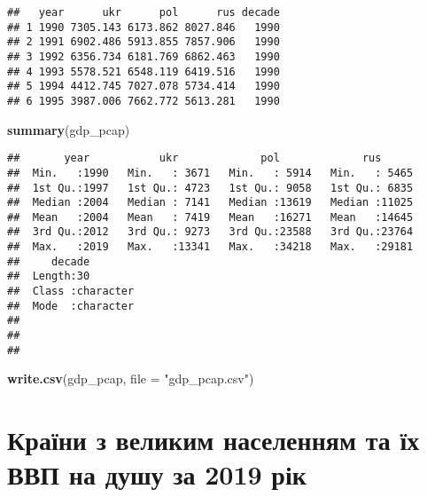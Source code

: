 \documentclass[
]{article}
\newenvironment{Shaded}{\begin{snugshade}}{\end{snugshade}}
\newcommand{\DataTypeTok}[1]{\textcolor[rgb]{0.13,0.29,0.53}{#1}}
\newcommand{\KeywordTok}[1]{\textcolor[rgb]{0.13,0.29,0.53}{\textbf{#1}}}
\newcommand{\NormalTok}[1]{#1}
\newcommand{\StringTok}[1]{\textcolor[rgb]{0.31,0.60,0.02}{#1}}
\begin{document}
\begin{verbatim}
##   year      ukr      pol      rus decade
## 1 1990 7305.143 6173.862 8027.846   1990
## 2 1991 6902.486 5913.855 7857.906   1990
## 3 1992 6356.734 6181.769 6862.463   1990
## 4 1993 5578.521 6548.119 6419.516   1990
## 5 1994 4412.745 7027.078 5734.414   1990
## 6 1995 3987.006 7662.772 5613.281   1990
\end{verbatim}

\begin{Shaded}
\begin{Highlighting}[]
\KeywordTok{summary}\NormalTok{(gdp_pcap)}
\end{Highlighting}
\end{Shaded}

\begin{verbatim}
##       year           ukr             pol             rus       
##  Min.   :1990   Min.   : 3671   Min.   : 5914   Min.   : 5465  
##  1st Qu.:1997   1st Qu.: 4723   1st Qu.: 9058   1st Qu.: 6835  
##  Median :2004   Median : 7141   Median :13619   Median :11025  
##  Mean   :2004   Mean   : 7419   Mean   :16271   Mean   :14645  
##  3rd Qu.:2012   3rd Qu.: 9273   3rd Qu.:23588   3rd Qu.:23764  
##  Max.   :2019   Max.   :13341   Max.   :34218   Max.   :29181  
##     decade         
##  Length:30         
##  Class :character  
##  Mode  :character  
##                    
##                    
## 
\end{verbatim}

\begin{Shaded}
\begin{Highlighting}[]
\KeywordTok{write.csv}\NormalTok{(gdp_pcap, }\DataTypeTok{file =} \StringTok{"gdp_pcap.csv"}\NormalTok{)}
\end{Highlighting}
\end{Shaded}

\hypertarget{ux43aux440ux430ux457ux43dux438-ux437-ux432ux435ux43bux438ux43aux438ux43c-ux43dux430ux441ux435ux43bux435ux43dux43dux44fux43c-ux442ux430-ux457ux445-ux432ux432ux43f-ux43dux430-ux434ux443ux448ux443-ux437ux430-2019-ux440ux456ux43a}{%
\section{Країни з великим населенням та їх ВВП на душу за 2019
рік}\label{ux43aux440ux430ux457ux43dux438-ux437-ux432ux435ux43bux438ux43aux438ux43c-ux43dux430ux441ux435ux43bux435ux43dux43dux44fux43c-ux442ux430-ux457ux445-ux432ux432ux43f-ux43dux430-ux434ux443ux448ux443-ux437ux430-2019-ux440ux456ux43a}}
\end{document}
